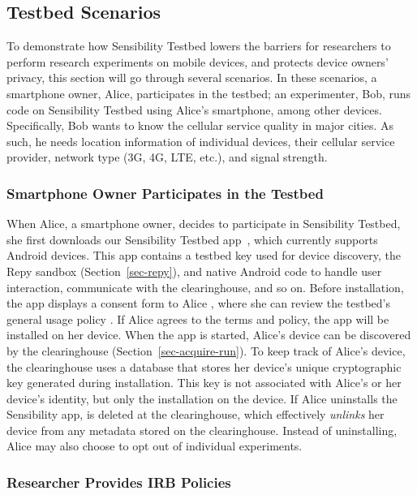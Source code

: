 \subsection{Testbed Scenarios}\label{sec-scenario}

To demonstrate how Sensibility Testbed lowers the barriers for
researchers to perform research experiments on mobile devices,
and protects device owners' privacy, this section will go
through several scenarios. In these scenarios, a smartphone owner, Alice,
participates in the testbed; an experimenter, Bob, runs code on
Sensibility Testbed using Alice's smartphone, among other
devices. Specifically, Bob wants to know the cellular service
quality in major cities. As such, he needs location information
of individual devices, their cellular service provider, network
type (3G, 4G, LTE, etc.), and signal strength.

\subsubsection{Smartphone Owner Participates in the Testbed}
\label{sec-owner-participate}

When Alice, a smartphone owner, decides to participate in
Sensibility Testbed, she first downloads our Sensibility Testbed
app~\cite{sensibility-app}, which currently supports Android devices.
This app contains a testbed key  used for 
device discovery, the Repy sandbox (Section~\ref{sec-repy}), 
and native Android code to handle user interaction, communicate 
with the clearinghouse, and so on. Before installation, the app displays a
consent form to Alice , where she can review
the testbed's general usage policy . If Alice
agrees to the terms and policy, the app will be installed on her
device. When the app is started, Alice's device can be
discovered by the clearinghouse (Section~\ref{sec-acquire-run}). 
To keep track of Alice's device, the
clearinghouse uses a database that stores her device's unique
cryptographic key  generated during
installation. This key is not associated with Alice's or her
device's identity, but only the installation on the device. If
Alice uninstalls the Sensibility app,  is
deleted at the clearinghouse, which effectively \textit{unlinks}
her device from any metadata stored on the clearinghouse.
Instead of uninstalling, Alice may also choose to opt out of
individual experiments.

\subsubsection{Researcher Provides IRB
Policies}\label{sec-irb-policy}

